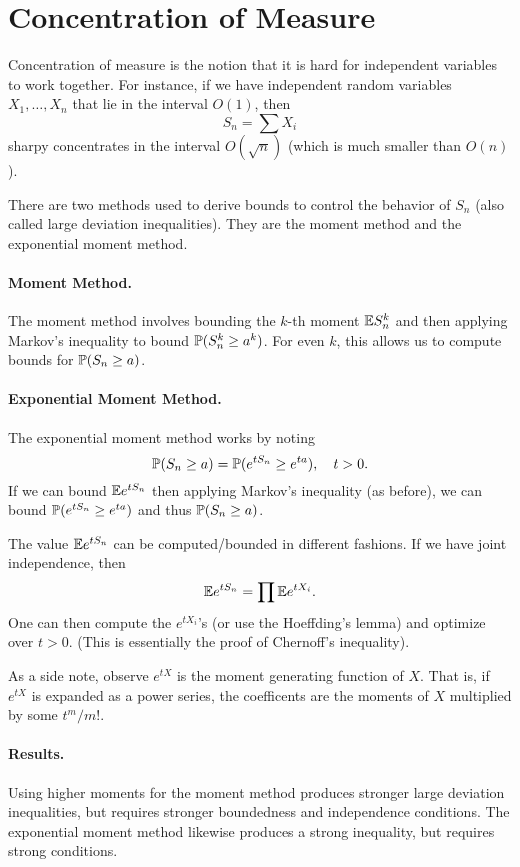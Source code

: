 \section*{Concentration of Measure}

Concentration of measure is the notion that it is hard for independent variables to work together. For instance, if we have independent random variables $X_1, \dots, X_n$ that lie in the interval $O(1)$, then
\[
    S_n = \sum X_i
\]
sharpy concentrates in the interval $O(\sqrt{n})$ (which is much smaller than $O(n)$).

There are two methods used to derive bounds to control the behavior of $S_n$ (also called large deviation inequalities). They are the moment method and the exponential moment method.

\paragraph{Moment Method.} The moment method involves bounding the $k$-th moment ${\mathbb E} S_n^k$ and then applying Markov's inequality to bound ${\mathbb P}(S_n^k \geq a^k)$. For even $k$, this allows us to compute bounds for ${\mathbb P}(S_n \geq a)$.

\paragraph{Exponential Moment Method.} The exponential moment method works by noting
\[
    {\mathbb P}(S_n \geq a) = {\mathbb P}( e^{tS_n} \geq e^{ta}), \quad t > 0.
\]
If we can bound ${\mathbb E} e^{tS_n}$ then applying Markov's inequality (as before), we can bound ${\mathbb P}( e^{tS_n} \geq e^{ta})$ and thus ${\mathbb P}(S_n \geq a)$.

The value ${\mathbb E} e^{tS_n}$ can be computed/bounded in different fashions. If we have joint independence, then
\[
    {\mathbb E} e^{tS_n} = \prod {\mathbb E} e^{tX_i}.
\]
One can then compute the $e^{tX_i}$'s (or use the Hoeffding's lemma) and optimize over $t > 0$. (This is essentially the proof of Chernoff's inequality).

As a side note, observe $e^{tX}$ is the moment generating function of $X$. That is, if $e^{tX}$ is expanded as a power series, the coefficents are the moments of $X$ multiplied by some $t^m/m!$.

\paragraph{Results.} Using higher moments for the moment method produces stronger large deviation inequalities, but requires stronger boundedness and independence conditions. The exponential moment method likewise produces a strong inequality, but requires strong conditions.

